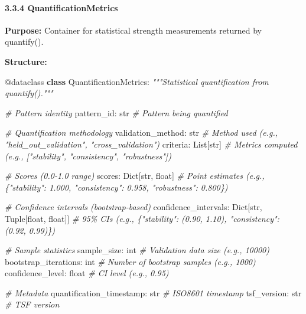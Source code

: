 \documentclass[
]{article}
\newenvironment{Shaded}{}{}
\newcommand{\AttributeTok}[1]{\textcolor[rgb]{0.49,0.56,0.16}{#1}}
\newcommand{\BuiltInTok}[1]{\textcolor[rgb]{0.00,0.50,0.00}{#1}}
\newcommand{\CommentTok}[1]{\textcolor[rgb]{0.38,0.63,0.69}{\textit{#1}}}
\newcommand{\KeywordTok}[1]{\textcolor[rgb]{0.00,0.44,0.13}{\textbf{#1}}}
\newcommand{\NormalTok}[1]{#1}
\begin{document}
\paragraph{3.3.4 QuantificationMetrics}\label{quantificationmetrics}

\textbf{Purpose:} Container for statistical strength measurements
returned by quantify().

\textbf{Structure:}

\begin{Shaded}
\begin{Highlighting}[]
\AttributeTok{@dataclass}
\KeywordTok{class}\NormalTok{ QuantificationMetrics:}
    \CommentTok{"""Statistical quantification from quantify()."""}

    \CommentTok{\# Pattern identity}
\NormalTok{    pattern\_id: }\BuiltInTok{str}                        \CommentTok{\# Pattern being quantified}

    \CommentTok{\# Quantification methodology}
\NormalTok{    validation\_method: }\BuiltInTok{str}                 \CommentTok{\# Method used (e.g., "held\_out\_validation", "cross\_validation")}
\NormalTok{    criteria: List[}\BuiltInTok{str}\NormalTok{]                    }\CommentTok{\# Metrics computed (e.g., ["stability", "consistency", "robustness"])}

    \CommentTok{\# Scores (0.0{-}1.0 range)}
\NormalTok{    scores: Dict[}\BuiltInTok{str}\NormalTok{, }\BuiltInTok{float}\NormalTok{]               }\CommentTok{\# Point estimates (e.g., \{"stability": 1.000, "consistency": 0.958, "robustness": 0.800\})}

    \CommentTok{\# Confidence intervals (bootstrap{-}based)}
\NormalTok{    confidence\_intervals: Dict[}\BuiltInTok{str}\NormalTok{, Tuple[}\BuiltInTok{float}\NormalTok{, }\BuiltInTok{float}\NormalTok{]]  }\CommentTok{\# 95\% CIs (e.g., \{"stability": (0.90, 1.10), "consistency": (0.92, 0.99)\})}

    \CommentTok{\# Sample statistics}
\NormalTok{    sample\_size: }\BuiltInTok{int}                       \CommentTok{\# Validation data size (e.g., 10000)}
\NormalTok{    bootstrap\_iterations: }\BuiltInTok{int}              \CommentTok{\# Number of bootstrap samples (e.g., 1000)}
\NormalTok{    confidence\_level: }\BuiltInTok{float}                \CommentTok{\# CI level (e.g., 0.95)}

    \CommentTok{\# Metadata}
\NormalTok{    quantification\_timestamp: }\BuiltInTok{str}          \CommentTok{\# ISO8601 timestamp}
\NormalTok{    tsf\_version: }\BuiltInTok{str}                       \CommentTok{\# TSF version}
\end{Highlighting}
\end{Shaded}
\end{document}
